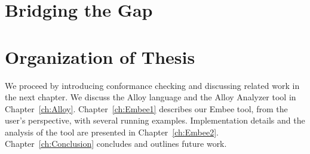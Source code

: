 \section{Bridging the Gap}


\section{Organization of Thesis}

We proceed by introducing conformance checking and discussing related work in the next
chapter. We discuss the Alloy language and the Alloy Analyzer tool in
Chapter~\ref{ch:Alloy}.  Chapter~\ref{ch:Embee1} describes our Embee tool, from the
user's perspective, with several running examples.  Implementation details and the
analysis of the tool are presented in Chapter~\ref{ch:Embee2}.
Chapter~\ref{ch:Conclusion} concludes and outlines future work.


